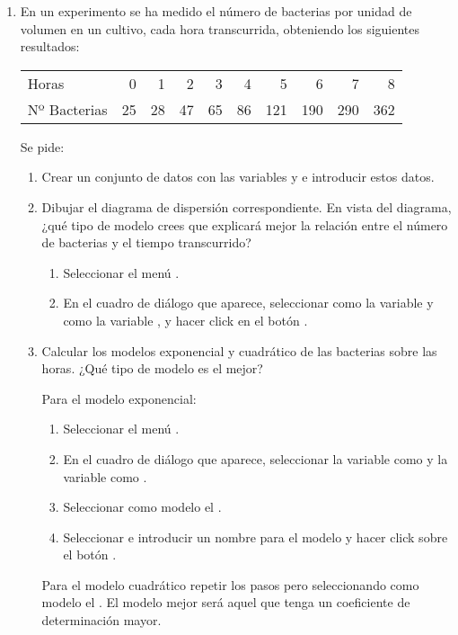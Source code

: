 \begin{enumerate}[leftmargin=*]
\item En un experimento se ha medido el número de bacterias por unidad de volumen en un cultivo, cada hora transcurrida,
obteniendo los siguientes resultados:
\begin{center}
\begin{tabular}{lrrrrrrrrr}
\hline
Horas & 0 & 1 & 2 & 3 & 4 & 5 & 6 & 7 & 8  \\
Nº Bacterias & 25 & 28 & 47 & 65 & 86 & 121 & 190 & 290 & 362\\
\hline
\end{tabular}
\end{center}

Se pide:
\begin{enumerate}
\item Crear un conjunto de datos con las variables  y  e introducir estos datos.

\item Dibujar el diagrama de dispersión correspondiente. En vista del diagrama, ¿qué tipo de modelo crees que explicará
mejor la relación entre el número de bacterias y el tiempo transcurrido? 
\begin{indicacion}{
\begin{enumerate}
\item Seleccionar el menú .
\item En el cuadro de diálogo que aparece, seleccionar como  la variable  y
como  la variable , y hacer click en el botón .
\end{enumerate}}
\end{indicacion}

\item Calcular los modelos exponencial y cuadrático de las bacterias sobre las horas. ¿Qué tipo de modelo es el mejor?
\begin{indicacion}{
Para el modelo exponencial:
\begin{enumerate}
\item Seleccionar el menú .
\item En el cuadro de diálogo que aparece, seleccionar la variable  como 
y la variable  como .
\item Seleccionar como modelo el .
\item Seleccionar  e introducir un nombre para el modelo y hacer click sobre el botón .
\end{enumerate}
Para el modelo cuadrático repetir los pasos pero seleccionando como modelo el . 
El modelo mejor será aquel que tenga un coeficiente de determinación mayor.
}
\end{indicacion}


\end{enumerate}
\end{enumerate}
